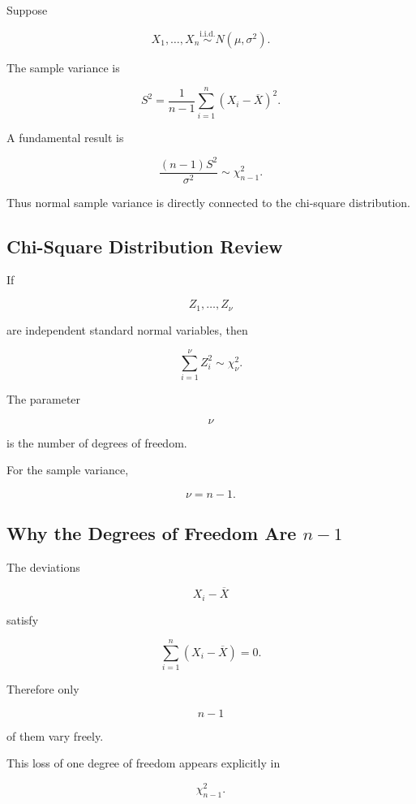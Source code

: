 Suppose

\[
X_1,\ldots,X_n
\overset{\text{i.i.d.}}{\sim}
N(\mu,\sigma^2).
\]

The sample variance is

\[
S^2
=
\frac1{n-1}
\sum_{i=1}^{n}
(X_i-\overline{X})^2.
\]

A fundamental result is

\[
\boxed{
\frac{
(n-1)S^2
}{
\sigma^2
}
\sim
\chi^2_{n-1}.
}
\]

Thus normal sample variance is directly connected to the chi-square
distribution.

\subsection{Chi-Square Distribution Review}
\label{subsec:chi-square-sampling-review}

If

\[
Z_1,\ldots,Z_\nu
\]

are independent standard normal variables, then

\[
\boxed{
\sum_{i=1}^{\nu}Z_i^2
\sim
\chi^2_\nu.
}
\]

The parameter

\[
\nu
\]

is the number of degrees of freedom.

For the sample variance,

\[
\boxed{
\nu=n-1.
}
\]

\subsection{Why the Degrees of Freedom Are \(n-1\)}
\label{subsec:variance-df-sampling}

The deviations

\[
X_i-\overline{X}
\]

satisfy

\[
\sum_{i=1}^{n}
(X_i-\overline{X})
=
0.
\]

Therefore only

\[
n-1
\]

of them vary freely.

This loss of one degree of freedom appears explicitly in

\[
\chi^2_{n-1}.
\]

